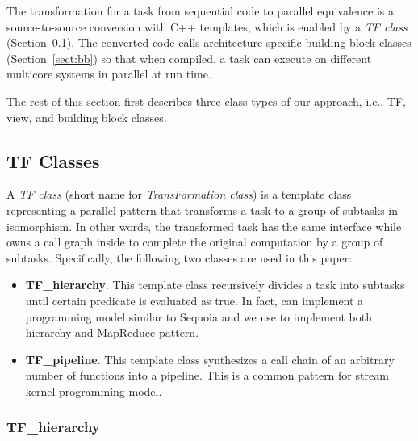 The transformation for a task from sequential code to parallel equivalence is a
source-to-source conversion with C++ templates, which is enabled by a \emph{TF
class} (Section~\ref{sect:tf}).  The converted code calls
architecture-specific building block classes (Section~\ref{sect:bb}) so that
when compiled, a task can execute on
different multicore systems in parallel at run time. 

The rest of this section first describes three class types of our approach, i.e.,
TF, view, and building block classes. 

\subsection{TF Classes}
\label{sect:tf}

A \textit{TF class} (short name for \textit{TransFormation class}) is a template
class representing a parallel pattern that transforms a task to a group of
subtasks in isomorphism. In other words, the transformed task has the same interface
while owns a call graph inside to complete the original computation by a
group of subtasks. Specifically, the following two classes are used in this paper: 

\begin{itemize} 
\item \textbf{TF\_hierarchy}. This template class recursively divides a task into subtasks
until certain predicate is evaluated as true. %
In fact,  can implement a programming model similar to Sequoia and
we use  to implement both hierarchy and MapReduce pattern.

\item \textbf{TF\_pipeline}. This template class synthesizes a call chain of an
arbitrary number of functions into a pipeline. This is a common pattern for
stream kernel programming model.
\end{itemize} 

\subsubsection{TF\_hierarchy}

